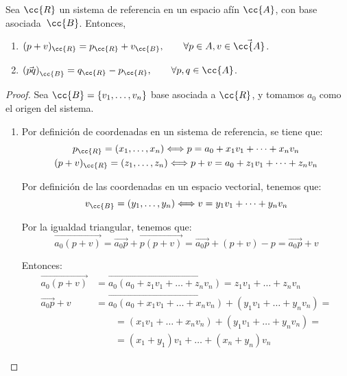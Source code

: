 \begin{lema}
    Sea $\cc{R}$ un sistema de referencia en un espacio afín $\cc{A}$, con base asociada~$\cc{B}$. Entonces,
    \begin{enumerate}
        \item $(p+v)_\cc{R}=p_{\cc{R}} + v_{\cc{B}},\qquad \forall p\in A, v\in \vec{\cc{A}}$.
        \item $\left(\vec{pq}\right)_{\cc{B}}=q_{\cc{R}}-p_{\cc{R}},\qquad \forall p,q\in \cc{A}$.
    \end{enumerate}
\end{lema}
\begin{proof}
    Sea $\cc{B}=\{v_1,\dots,v_n\}$ base asociada a $\cc{R}$, y tomamos $a_0$ como el origen del sistema.
    \begin{enumerate}
        \item Por definición de coordenadas en un sistema de referencia, se tiene que:
        \begin{gather*}
            p_{\cc{R}}=(x_1,\dots,x_n)\Longleftrightarrow p=a_0+x_1v_1+\dots + x_nv_n\\
            (p+v)_{\cc{R}}=(z_1,\dots,z_n) \Longleftrightarrow p+v=a_0+z_1v_1+\dots+z_nv_n
        \end{gather*}

        Por definición de las coordenadas en un espacio vectorial, tenemos que:
        \begin{equation*}
            v_{\cc{B}}=(y_1,\dots,y_n)\Longleftrightarrow v=y_1v_1+\dots+y_nv_n
        \end{equation*}

        Por la igualdad triangular, tenemos que:
        \begin{equation*}
            \vec{a_0(p+v)} = \vec{a_0p} + \vec{p(p+v)} = \vec{a_0p} + (p+v)-p = \vec{a_0p} +v
        \end{equation*}
        
        Entonces:
        \begin{equation*}\begin{split}
            \vec{a_0(p+v)} &= \vec{a_0(a_0+z_1v_1+\dots+z_nv_n)} = z_1v_1+\dots+z_nv_n \\
            \vec{a_0p}+v &= \vec{a_0(a_0+x_1v_1+\dots+x_nv_n)} + (y_1v_1+\dots+y_nv_n) =\\&\qquad=
            (x_1v_1+\dots+x_nv_n) + (y_1v_1+\dots+y_nv_n) =\\&\qquad= (x_1+y_1)v_1 + \dots + (x_n+y_n)v_n
        \end{split}\end{equation*}


\end{enumerate}
\end{proof}
